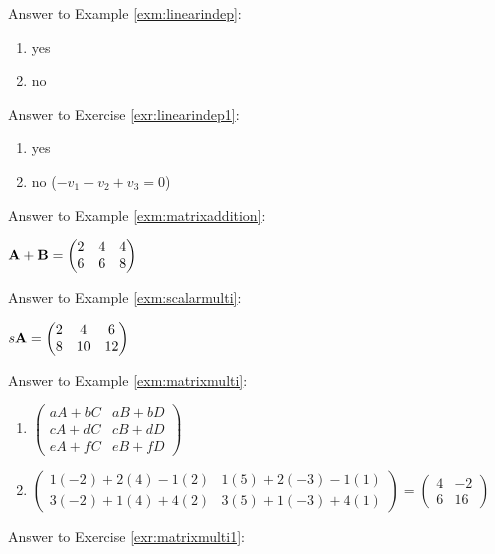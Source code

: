 \documentclass[
]{book}
\providecommand{\tightlist}{%
  \setlength{\itemsep}{0pt}\setlength{\parskip}{0pt}}
\theoremstyle{definition}
\theoremstyle{definition}
\theoremstyle{definition}
\theoremstyle{definition}
\theoremstyle{remark}
\begin{document}
Answer to Example \ref{exm:linearindep}:

\begin{enumerate}
\def\labelenumi{\arabic{enumi}.}
\tightlist
\item
  yes
\item
  no
\end{enumerate}

Answer to Exercise \ref{exr:linearindep1}:

\begin{enumerate}
\def\labelenumi{\arabic{enumi}.}
\tightlist
\item
  yes
\item
  no (\(-v_1 -v_2 + v_3 = 0\))
\end{enumerate}

Answer to Example \ref{exm:matrixaddition}:

\({\bf A+B}=\begin{pmatrix} 2 & 4 & 4 \\ 6 & 6 & 8 \end{pmatrix}\)

Answer to Example \ref{exm:scalarmulti}:

\(s {\bf A} = \begin{pmatrix} 2 & 4 & 6 \\ 8 & 10 & 12 \end{pmatrix}\)

Answer to Example \ref{exm:matrixmulti}:

\begin{enumerate}
\def\labelenumi{\arabic{enumi}.}
\item
  \(\begin{pmatrix} aA+bC&aB+bD\\cA+dC&cB+dD\\eA+fC&eB+fD \end{pmatrix}\)
\item
  \(\begin{pmatrix} 1(-2)+2(4)-1(2)&1(5)+2(-3)-1(1)\\  3(-2)+1(4)+4(2)&3(5)+1(-3)+4(1)\end{pmatrix} =  \begin{pmatrix} 4&-2\\6&16\end{pmatrix}\)
\end{enumerate}

Answer to Exercise \ref{exr:matrixmulti1}:
\end{document}
